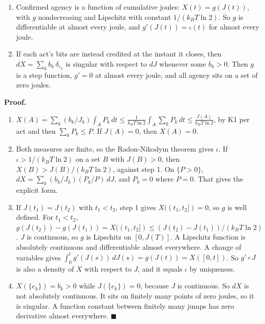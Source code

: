 \documentclass[
  10pt,
]{article}
\providecommand{\tightlist}{%
  \setlength{\itemsep}{0pt}\setlength{\parskip}{0pt}}
\begin{document}
\begin{enumerate}
\def\labelenumi{\arabic{enumi}.}
\setcounter{enumi}{2}
\tightlist
\item
  Confirmed agency is a function of cumulative joules:
  \(X(t) = g(J(t))\), with \(g\) nondecreasing and Lipschitz with
  constant \(1/(k_B T\ln 2)\). So \(g\) is differentiable at almost
  every joule, and \(g'(J(t)) = \iota(t)\) for almost every joule.
\item
  If each act's bits are instead credited at the instant it closes, then
  \(dX = \sum_k b_k\,\delta_{e_k}\) is singular with respect to \(dJ\)
  whenever some \(b_k > 0\). Then \(g\) is a step function, \(g' = 0\)
  at almost every joule, and all agency sits on a set of zero joules.
\end{enumerate}

\textbf{Proof.}

\begin{enumerate}
\def\labelenumi{\arabic{enumi}.}
\tightlist
\item
  \(X(A) = \sum_k (b_k/J_k)\int_A P_k\,dt \le \frac{1}{k_BT\ln 2}\int_A \sum_k P_k\,dt \le \frac{J(A)}{k_BT\ln 2}\),
  by K1 per act and then \(\sum_k P_k \le P\). If \(J(A) = 0\), then
  \(X(A) = 0\).
\item
  Both measures are finite, so the Radon-Nikodym theorem gives
  \(\iota\). If \(\iota > 1/(k_BT\ln 2)\) on a set \(B\) with
  \(J(B) > 0\), then \(X(B) > J(B)/(k_BT\ln 2)\), against step 1. On
  \(\{P > 0\}\), \(dX = \sum_k (b_k/J_k)(P_k/P)\,dJ\), and \(P_k = 0\)
  where \(P = 0\). That gives the explicit form.
\item
  If \(J(t_1) = J(t_2)\) with \(t_1 < t_2\), step 1 gives
  \(X((t_1,t_2]) = 0\), so \(g\) is well defined. For \(t_1 < t_2\),
  \(g(J(t_2)) - g(J(t_1)) = X((t_1,t_2]) \le (J(t_2) - J(t_1))/(k_BT\ln 2)\).
  \(J\) is continuous, so \(g\) is Lipschitz on \([0, J(T)]\). A
  Lipschitz function is absolutely continuous and differentiable almost
  everywhere. A change of variables gives
  \(\int_0^t g'(J(s))\,dJ(s) = g(J(t)) = X([0,t])\). So \(g'\circ J\) is
  also a density of \(X\) with respect to \(J\), and it equals \(\iota\)
  by uniqueness.
\item
  \(X(\{e_k\}) = b_k > 0\) while \(J(\{e_k\}) = 0\), because \(J\) is
  continuous. So \(dX\) is not absolutely continuous. It sits on
  finitely many points of zero joules, so it is singular. A function
  constant between finitely many jumps has zero derivative almost
  everywhere. \(\blacksquare\)
\end{enumerate}
\end{document}
